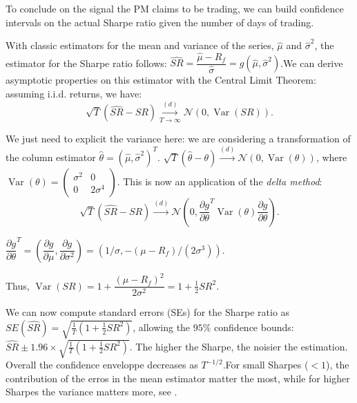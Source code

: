 To conclude on the signal the PM claims to be trading, we can build confidence intervals on the actual Sharpe ratio given the number of days of trading.

With classic estimators for the mean and variance of the series, $\hat{\mu}$ and $\hat{\sigma}^2$, the estimator for the Sharpe ratio follows: $\widehat{SR} = \dfrac{\hat{\mu} - R_f}{\hat{\sigma}} = g(\hat{\mu}, \hat{\sigma}^2)$.\newline We can derive asymptotic properties on this estimator with the Central Limit Theorem: assuming i.i.d. returns, we have: \[\sqrt{T}(\widehat{SR} - SR) \stackrel{(d)}{\underset{T \to \infty}{\longrightarrow}} \mathcal{N}(0, \operatorname{Var}(SR)).\]

We just need to explicit the variance here: we are considering a transformation of the column estimator $\hat{\theta} = (\hat{\mu}, \hat{\sigma}^2)^{T}$. $\sqrt{T}(\hat{\theta} - \theta) \overset{(d)}{\longrightarrow} \mathcal{N}(0, \operatorname{Var}(\theta))$, where $\operatorname{Var}(\theta) = \begin{pmatrix} \sigma^2 & 0\\ 0 & 2\sigma^4 \end {pmatrix}.$ \newline This is now an application of the \textit{delta method}: \[\sqrt{T}(\widehat{SR} - SR) \overset{(d)}{\longrightarrow} \mathcal{N}\left(0, \dfrac{\partial g}{\partial \theta}^{T} \operatorname{Var}(\theta) \dfrac{\partial g}{\partial \theta}\right).\]

$\dfrac{\partial g}{\partial \theta}^{T} = \left(\dfrac{\partial g}{\partial \mu}, \dfrac{\partial g}{\partial \sigma^2}\right) = \left(1/\sigma, -(\mu - R_f) / (2\sigma^3)\right).$

Thus, $\operatorname{Var}(SR) = 1 + \dfrac{(\mu - R_f)^2}{2\sigma^2} = 1 + \frac1{2}SR^2.$

We can now compute standard errors (SEs) for the Sharpe ratio as $SE(\widehat{SR}) = \sqrt{\frac1{T}(1+\frac1{2} SR^2)}$, allowing the $95\%$ confidence bounds: $\widehat{SR} \pm 1.96 \times \sqrt{\frac1{T}(1+\frac1{2} SR^2)}$. The higher the Sharpe, the noisier the estimation. Overall the confidence enveloppe decreases as $T^{-1/2}$.\newline For small Sharpes ($< 1$), the contribution of the erros in the mean estimator matter the most, while for higher Sharpes the variance matters more, see \cite{lo2002statistics}.